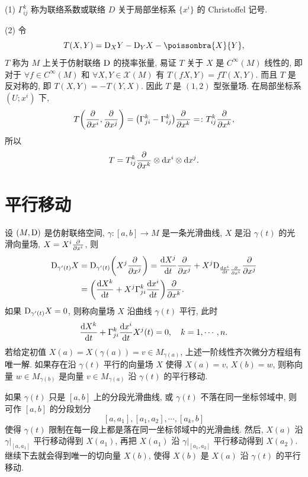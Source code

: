 \begin{remark}
  (1) $\Gamma_{ij}^k$ 称为联络系数或联络 $D$ 关于局部坐标系 $\{x^i\}$ 的 Christoffel 记号.

  (2) 令
  \[T(X,Y) = \D_XY - \D_YX - \poissonbra{X}{Y},\]
  $T$ 称为 $M$ 上关于仿射联络 $\mathrm{D}$ 的挠率张量, 易证 $T$ 关于 $X$ 是 $C^{\infty}(M)$
  线性的, 即对于 $\forall f\in C^{\infty}(M)$ 和 $\forall X,Y\in\mathscr{X}(M)$
  有 $T(fX,Y)=fT(X,Y)$. 而且 $T$ 是反对称的, 即 $T(X,Y)=-T(Y,X)$.
  因此 $T$ 是 $(1,2)$ 型张量场. 在局部坐标系 $(U;x^i)$ 下,
  \[T\biggl(\pdv{x^i},\pdv{x^j}\biggr)
    = \bigl(\Gamma_{ji}^k-\Gamma_{ij}^k\bigr)\pdv{x^k} =\colon T_{ij}^k\pdv{x^k},\]
  所以
  \[T = T_{ij}^k\pdv{x^k}\otimes\mathop{}\!\mathrm{d} x^i\otimes\mathop{}\!\mathrm{d} x^j.\]
\end{remark}



\section{平行移动}



设 $(M,\mathrm{D})$ 是仿射联络空间, $\gamma:[a,b]\to M$ 是一条光滑曲线, $X$ 是沿 $\gamma(t)$
的光滑向量场, $X=X^i\pdv{x^i}$, 则
\begin{align*}
  \D_{\gamma'(t)} X
  & = \D_{\gamma'(t)} \biggl(X^j\pdv{x^j}\biggr)
    = \frac{\diff X^j}{\diff t}\pdv{x^j} + X^j\D_{\frac{\diff x^i}{\diff t}\pdv{x^i}}\pdv{x^j} \\
  & = \biggl(\frac{\diff X^k}{\diff t} + X^j\Gamma_{ji}^k\frac{\diff x^i}{\diff t}\biggr)\pdv{x^k}.
\end{align*}
如果 $\mathrm{D}_{\gamma'(t)}X=0$, 则称向量场 $X$ 沿曲线 $\gamma(t)$ 平行, 此时
\begin{equation}\label{eq:1.4.1}
  \frac{\mathop{}\!\mathrm{d} X^k}{\mathop{}\!\mathrm{d} t} + \Gamma_{ji}^k \frac{\mathop{}\!\mathrm{d} x^i}{\mathop{}\!\mathrm{d} t}X^j(t)=0,\quad k=1,\cdots,n.
\end{equation}
若给定初值 $X(a)=X(\gamma(a))=v\in M_{\gamma(a)}$, 上述一阶线性齐次微分方程组有唯一解.
如果存在沿 $\gamma(t)$ 平行的向量场 $X$ 使得 $X(a)=v$, $X(b)=w$,
则称向量 $w\in M_{\gamma(b)}$ 是向量 $v\in M_{\gamma(a)}$ 沿 $\gamma(t)$ 的平行移动.

如果 $\gamma(t)$ 只是 $[a,b]$ 上的分段光滑曲线, 或 $\gamma(t)$
不落在同一坐标邻域中, 则可作 $[a,b]$ 的分段划分
\[[a,a_1], [a_1,a_2], \cdots, [a_k,b]\]
使得 $\gamma(t)$ 限制在每一段上都是落在同一坐标邻域中的光滑曲线.
然后, $X(a)$ 沿 $\gamma|_{[a,a_1]}$ 平行移动得到 $X(a_1)$,
再把 $X(a_1)$ 沿 $\gamma|_{[a_1,a_2]}$ 平行移动得到 $X(a_2)$.
继续下去就会得到唯一的切向量 $X(b)$, 使得 $X(b)$ 是 $X(a)$ 沿 $\gamma(t)$ 的平行移动.

